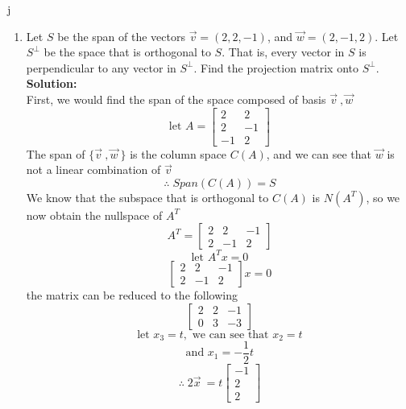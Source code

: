j\documentclass[12pt]{article}
\begin{document}
\begin{enumerate}
    
	\item Let $S$ be the span of the vectors $\vec v = (2,2,-1)$, and $\vec w = (2,-1,2)$.  Let $S^{\perp}$ be the space that is orthogonal to $S$.  That is, every vector in $S$ is perpendicular to any vector in $S^{\perp}$.  Find the projection matrix onto $S^{\perp}$.  \\
	\textbf{Solution:}\\
             First, we would find the span of the space composed of basis $\vec v\ ,\vec w$
             \[
             \text{let } A =
             \begin{bmatrix}
                 2&2\\
                 2&-1\\
                 -1&2
             \end{bmatrix}
             \]
             The span of $\{\vec v\ ,\vec w\ \}$ is the column space $C(A)$, and we can see that $\vec w$ is not a linear combination of $\vec v$
             \[
             \therefore \; Span(C(A))=S
             \]
             We know that the subspace that is orthogonal to $C(A)$ is $N(A^T)$, so we now obtain the nullspace of $A^T$
             \[
             A^T=
             \begin{bmatrix}
                 2&2&-1\\
                 2&-1&2
             \end{bmatrix}
             \]
             \[
             \text{let }A^Tx=0
             \]
             \[
             \begin{bmatrix}
                 2&2&-1\\
                 2&-1&2
             \end{bmatrix}
             x=0
             \]
             the matrix can be reduced to the following
             \[
             \begin{bmatrix}
                 2&2&-1\\
                 0&3&-3
             \end{bmatrix}
             \]
             \[
             \text{let } x_3=t, \text{ we can see that }x_2=t
             \]
             \[
             \text{and } x_1=-\frac{1}{2}t
             \]
             \[
             \therefore \; 
             2\vec x\ = 
             t\begin{bmatrix}
                 -1\\2\\2
             \end{bmatrix}
\]
\end{enumerate}
\end{document}
